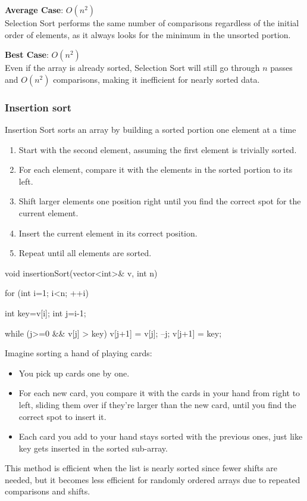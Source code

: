 \documentclass{report}
\begin{document}
\bigbreak \noindent 
\textbf{Average Case}: \( O(n^2) \) \\
\bigbreak \noindent 
Selection Sort performs the same number of comparisons regardless of the initial order of elements, as it always looks for the minimum in the unsorted portion.

\bigbreak \noindent 
\textbf{Best Case}: \( O(n^2) \) \\
\bigbreak \noindent 
Even if the array is already sorted, Selection Sort will still go through \( n \) passes and \( O(n^2) \) comparisons, making it inefficient for nearly sorted data.


\pagebreak 
\subsubsection{Insertion sort}
\bigbreak \noindent 
Insertion Sort sorts an array by building a sorted portion one element at a time
\bigbreak \noindent 
\begin{enumerate}
    \item Start with the second element, assuming the first element is trivially sorted.
    \item For each element, compare it with the elements in the sorted portion to its left.
    \item Shift larger elements one position right until you find the correct spot for the current element.
    \item Insert the current element in its correct position.
    \item Repeat until all elements are sorted.
\end{enumerate}
\bigbreak \noindent 
\begin{cppcode}
    void insertionSort(vector<int>& v, int n) {
        for (int i=1; i<n; ++i) {
            int key=v[i];
            int j=i-1;

        while (j>=0 && v[j] > key) {
            v[j+1] = v[j];
            --j;
        }
        v[j+1] = key;
    }
}
\end{cppcode}
\bigbreak \noindent 
Imagine sorting a hand of playing cards:
\begin{itemize}
    \item You pick up cards one by one.
    \item For each new card, you compare it with the cards in your hand from right to left, sliding them over if they’re larger than the new card, until you find the correct spot to insert it.
    \item Each card you add to your hand stays sorted with the previous ones, just like key gets inserted in the sorted sub-array.
\end{itemize}
This method is efficient when the list is nearly sorted since fewer shifts are needed, but it becomes less efficient for randomly ordered arrays due to repeated comparisons and shifts.
\end{document}
